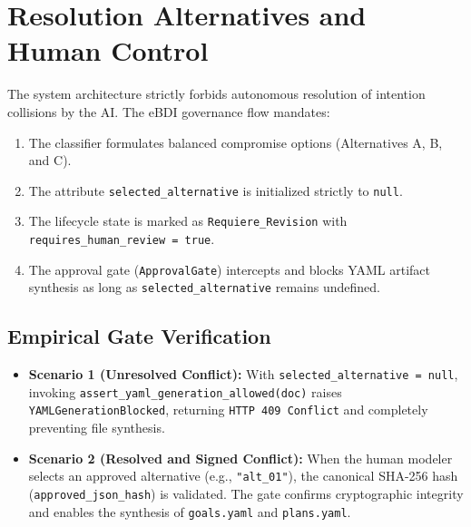 \documentclass[11pt,a4paper]{article}
\begin{document}
\section{Resolution Alternatives and Human Control}
The system architecture strictly forbids autonomous resolution of intention collisions by the AI. The eBDI governance flow mandates:
\begin{enumerate}
    \item The classifier formulates balanced compromise options (Alternatives A, B, and C).
    \item The attribute \texttt{selected\_alternative} is initialized strictly to \texttt{null}.
    \item The lifecycle state is marked as \texttt{Requiere\_Revision} with \texttt{requires\_human\_review = true}.
    \item The approval gate (\texttt{ApprovalGate}) intercepts and blocks YAML artifact synthesis as long as \texttt{selected\_alternative} remains undefined.
\end{enumerate}

\subsection{Empirical Gate Verification}
\begin{itemize}
    \item \textbf{Scenario 1 (Unresolved Conflict):} With \texttt{selected\_alternative = null}, invoking \texttt{assert\_yaml\_generation\_allowed(doc)} raises \texttt{YAMLGenerationBlocked}, returning \texttt{HTTP 409 Conflict} and completely preventing file synthesis.
    \item \textbf{Scenario 2 (Resolved and Signed Conflict):} When the human modeler selects an approved alternative (e.g., \texttt{"alt\_01"}), the canonical SHA-256 hash (\texttt{approved\_json\_hash}) is validated. The gate confirms cryptographic integrity and enables the synthesis of \texttt{goals.yaml} and \texttt{plans.yaml}.
\end{itemize}

\end{document}
